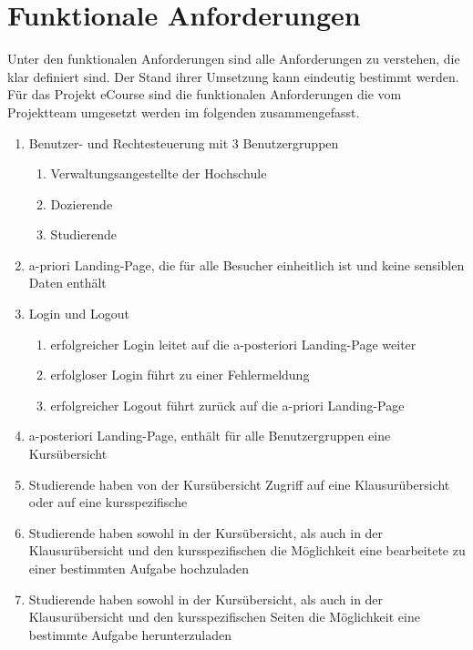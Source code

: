 
\chapter{Funktionale Anforderungen}
\label{sec:funktionale_Anforderungen}
Unter den funktionalen Anforderungen sind alle Anforderungen zu verstehen, die klar definiert sind. Der Stand ihrer Umsetzung kann eindeutig bestimmt werden. \\
Für das Projekt eCourse sind die funktionalen Anforderungen die vom Projektteam umgesetzt werden im folgenden zusammengefasst.\\
\begin{enumerate}
	\item Benutzer- und Rechtesteuerung mit 3 Benutzergruppen
	\begin{enumerate}
		\item \gls{Verwaltungsangestellte} der Hochschule
		\item \gls{Dozierende}
		\item \gls{Studierende}
	\end{enumerate}
	\item a-priori \gls{Landing-Page}, die für alle Besucher einheitlich ist und keine sensiblen Daten enthält
	\item Login und Logout
	\begin{enumerate}
		\item erfolgreicher Login leitet auf die a-posteriori \gls{Landing-Page} weiter
		\item erfolgloser Login führt zu einer Fehlermeldung
		\item erfolgreicher Logout führt zurück auf die a-priori \gls{Landing-Page}
	\end{enumerate}
	\item a-posteriori \gls{Landing-Page}, enthält für alle Benutzergruppen eine Kursübersicht
	\item \gls{Studierende} haben von der Kursübersicht Zugriff auf eine Klausurübersicht oder auf eine \gls{kursspezifische}
	\item \gls{Studierende} haben sowohl in der Kursübersicht, als auch in der Klausurübersicht und den \gls{kursspezifische}n die Möglichkeit eine \gls{bearbeitete} zu einer bestimmten \gls{Aufgabe} hochzuladen
	\item \gls{Studierende} haben sowohl in der Kursübersicht, als auch in der Klausurübersicht und den \gls{kursspezifische}n Seiten die Möglichkeit eine bestimmte \gls{Aufgabe} herunterzuladen

\end{enumerate}

